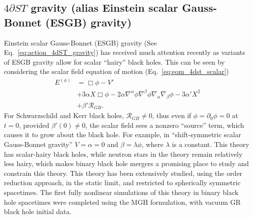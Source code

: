 \documentclass{ws-ijmpd}
\begin{document}
\subsection{$4\partial ST$ gravity (alias
Einstein scalar Gauss-Bonnet (ESGB) gravity\label{sec:esgb_numerical})}
Einstein scalar Gauss-Bonnet (ESGB) gravity
(See Eq.~\eqref{eq:action_4dST_gravity}) 
has received much attention recently as variants of
ESGB gravity allow for scalar ``hairy'' black 
holes\cite{Kanti:1995vq,Sotiriou:2013qea,Sotiriou:2014pfa}.
This can be seen by considering the scalar field equation of motion
(Eq.~\eqref{eq:eom_4dst_scalar})
\begin{align}
   \label{eq:scalar_eom_4est_again}
   E^{(\phi)}
   &=
   \Box\phi - V'
   \nonumber\\
   &+
   3\alpha X\Box\phi
   -
   2\alpha 
   \nabla^{\alpha}\phi\nabla^{\beta}\phi\nabla_{\alpha}\nabla_{\beta}\phi
   -
   3\alpha' X^2
   \nonumber\\
   &+
   \beta'\mathcal{R}_{GB}
   .
\end{align}
For Schwarzschild and Kerr black holes, $\mathcal{R}_{GB}\neq0$,
thus even if $\phi=\partial_0\phi=0$ at $t=0$, provided
$\beta'\left(0\right)\neq0$, the scalar field sees a nonzero
``source'' term, which causes it to grow about the black hole.
For example, in ``shift-symmetric scalar Gauss-Bonnet gravity''
$V=\alpha=0$ and $\beta=\lambda\phi$, where $\lambda$ is
a constant. This theory has scalar-hairy black holes,
while neutron stars in the theory remain relatively less
hairy, which makes binary black hole mergers a promising place
to study and constrain this theory\cite{Yagi:2015oca}.
This theory has been extensively studied,
using the order reduction approach\cite{Benkel:2016rlz,Benkel:2016kcq,
Witek:2018dmd,Okounkova:2019zep,Okounkova:2020rqw},
in the static limit\cite{Sotiriou:2014pfa,Sullivan:2020zpf}, 
and restricted to spherically
symmetric spacetimes\cite{Ripley:2019irj,Ripley:2019aqj}.
The first fully nonlinear simulations of this theory in binary
black hole spacetimes were completed using the MGH 
formulation, with vacuum GR black hole initial data\cite{East:2020hgw}.
\end{document}
